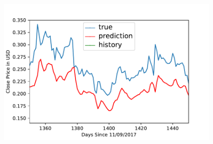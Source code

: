 \begin{figure}[p]
\begin{minipage}{.4\textwidth}
\end{minipage}
\ \
\begin{minipage}{.4\textwidth}
\includegraphics[width=1.0\textwidth]{images/DOGE-USD-prediction-model-zoomed.pdf}
\end{minipage}


\end{figure}
